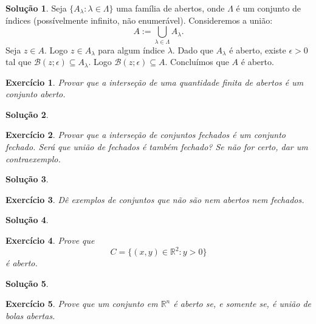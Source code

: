 \documentclass[a4paper,12pt]{article}
\newcommand{\R}{\mathbb{R}}
\newcommand{\B}{\mathcal{B}}
\theoremstyle{exer}
\newtheorem{exercise}{Exercício}
\theoremstyle{definition}
\newtheorem{solution}{Solução}
\theoremstyle{plain}
\begin{document}
\begin{solution}
    Seja $\{A_{\lambda} : \lambda \in \Lambda\}$ uma família de abertos, onde
    $\Lambda$ é um conjunto de índices (possívelmente infinito, não
    enumerável). Consideremos a união:
    $$
    A := \bigcup_{\lambda \in \Lambda} A_{\lambda}.
    $$
    Seja $z \in A$. Logo $z \in A_{\lambda}$ para algum índice $\lambda$. Dado
    que $A_{\lambda}$ é aberto, existe $\epsilon > 0$ tal que $\B(z; \epsilon)
    \subseteq A_{\lambda}$. Logo $\B(z; \epsilon) \subseteq A$. Concluímos que $A$ é aberto.
\end{solution}

\begin{exercise}
    Provar que a interseção de uma quantidade finita de abertos é um conjunto aberto.
\end{exercise}

\begin{solution}

\end{solution}

\begin{exercise}
    Provar que a interseção de conjuntos fechados é um conjunto fechado. Será que união de fechados é também fechado? Se não for certo, dar um contraexemplo.
\end{exercise}

\begin{solution}

\end{solution}

\begin{exercise}
    Dê exemplos de conjuntos que não são nem abertos nem fechados.
\end{exercise}

\begin{solution}

\end{solution}

\begin{exercise}
    Prove que 
    $$C = \{(x, y) \in \R^2 : y > 0\}$$
    é aberto.
\end{exercise}

\begin{solution}

\end{solution}

\begin{exercise}
    Prove que um conjunto em $\R^n$ é aberto se, e somente se, é união de bolas abertas.
\end{exercise}
\end{document}
